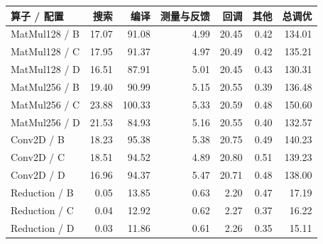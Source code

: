 \begin{tabular*}{\textwidth}{@{\extracolsep{\fill}}lrrrrrr@{}}
\toprule
算子 / 配置 & 搜索 & 编译 & 测量与反馈 & 回调 & 其他 & 总调优 \\
\midrule
MatMul128 / B & 17.07 & 91.08 & 4.99 & 20.45 & 0.42 & 134.01 \\
MatMul128 / C & 17.95 & 91.37 & 4.97 & 20.49 & 0.42 & 135.21 \\
MatMul128 / D & 16.51 & 87.91 & 5.01 & 20.45 & 0.43 & 130.31 \\
\midrule
MatMul256 / B & 19.40 & 90.99 & 5.15 & 20.55 & 0.39 & 136.48 \\
MatMul256 / C & 23.88 & 100.33 & 5.33 & 20.59 & 0.48 & 150.60 \\
MatMul256 / D & 21.53 & 84.93 & 5.16 & 20.55 & 0.40 & 132.57 \\
\midrule
Conv2D / B & 18.23 & 95.38 & 5.38 & 20.75 & 0.49 & 140.23 \\
Conv2D / C & 18.51 & 94.52 & 4.89 & 20.80 & 0.51 & 139.23 \\
Conv2D / D & 16.96 & 94.37 & 5.47 & 20.71 & 0.48 & 138.00 \\
\midrule
Reduction / B & 0.05 & 13.85 & 0.63 & 2.20 & 0.47 & 17.19 \\
Reduction / C & 0.04 & 12.92 & 0.62 & 2.27 & 0.37 & 16.22 \\
Reduction / D & 0.03 & 11.86 & 0.61 & 2.26 & 0.35 & 15.11 \\
\bottomrule
\end{tabular*}
